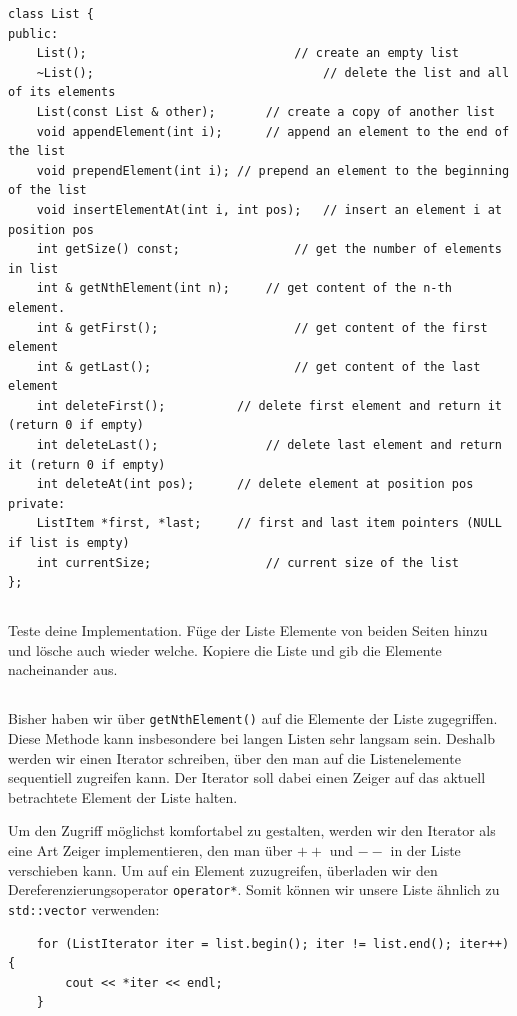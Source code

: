\begin{lstlisting}
class List {
public:
	List();								// create an empty list
	~List();								// delete the list and all of its elements
	List(const List & other);		// create a copy of another list
	void appendElement(int i);		// append an element to the end of the list
	void prependElement(int i);	// prepend an element to the beginning of the list
	void insertElementAt(int i, int pos);	// insert an element i at position pos
	int getSize() const;				// get the number of elements in list
	int & getNthElement(int n);		// get content of the n-th element.
	int & getFirst();					// get content of the first element
	int & getLast();					// get content of the last element
	int deleteFirst();			// delete first element and return it (return 0 if empty)
	int deleteLast();				// delete last element and return it (return 0 if empty)
	int deleteAt(int pos);		// delete element at position pos
private:
	ListItem *first, *last;		// first and last item pointers (NULL if list is empty)
	int currentSize;				// current size of the list
};
\end{lstlisting}

\subsection{}
Teste deine Implementation.
Füge der Liste Elemente von beiden Seiten hinzu und lösche auch wieder welche.
Kopiere die Liste und gib die Elemente nacheinander aus.

\subsection{}
Bisher haben wir über \texttt{getNthElement()} auf die Elemente der Liste zugegriffen.
Diese Methode kann insbesondere bei langen Listen sehr langsam sein.
Deshalb werden wir einen Iterator schreiben, über den man auf die Listenelemente sequentiell zugreifen kann.
Der Iterator soll dabei einen Zeiger auf das aktuell betrachtete Element der Liste halten.

Um den Zugriff möglichst komfortabel zu gestalten, werden wir den Iterator als eine Art Zeiger implementieren, den man über \textbf{$++$} und \textbf{$--$} in der Liste verschieben kann.
Um auf ein Element zuzugreifen, überladen wir den Dereferenzierungsoperator \texttt{operator*}.
Somit können wir unsere Liste ähnlich zu \texttt{std::vector} verwenden:
\begin{lstlisting}
	for (ListIterator iter = list.begin(); iter != list.end(); iter++) {
		cout << *iter << endl;
	}
\end{lstlisting}


